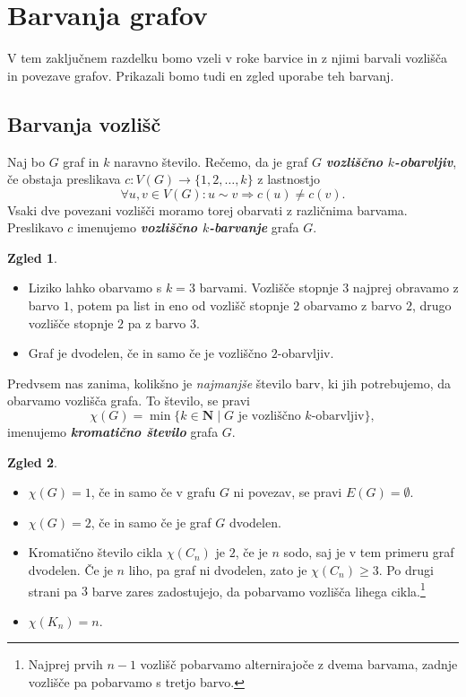 \documentclass[11pt]{book}
\def\NN{\mathbf{N}}
\def\definicija{\color{rdeca}\bf\em}
\theoremstyle{definition}
\theoremstyle{zgled}
\newtheorem*{zgled}{Zgled}
\theoremstyle{odprtproblem}
\theoremstyle{domacanaloga}
\theoremstyle{izrek}
\begin{document}
\section{Barvanja grafov}

V tem zaključnem razdelku bomo vzeli v roke barvice in z njimi barvali vozlišča in povezave grafov. Prikazali bomo tudi en zgled uporabe teh barvanj.

\subsection{Barvanja vozlišč}

Naj bo $G$ graf in $k$ naravno število. Rečemo, da je graf $G$ {\definicija vozliščno $k$-obarvljiv}, če obstaja preslikava $c \colon V(G) \to \{ 1,2, \dots, k\}$ z lastnostjo
\[
    \forall u,v \in V(G) \colon u \sim v \Rightarrow c(u) \neq c(v).
\]
Vsaki dve povezani vozlišči moramo torej obarvati z različnima barvama. Preslikavo $c$ imenujemo {\definicija vozliščno $k$-barvanje} grafa $G$.

\begin{zgled} \leavevmode
\begin{itemize}
\item Liziko lahko obarvamo s $k = 3$ barvami. Vozlišče stopnje $3$ najprej obravamo z barvo $1$, potem pa list in eno od vozlišč stopnje $2$ obarvamo z barvo $2$, drugo vozlišče stopnje $2$ pa z barvo $3$. 
\item Graf je dvodelen, če in samo če je vozliščno $2$-obarvljiv.
\end{itemize}
\end{zgled}

Predvsem nas zanima, kolikšno je \emph{najmanjše} število barv, ki jih potrebujemo, da obarvamo vozlišča grafa. To število, se pravi
\[
\chi(G) = \min \{ k \in \NN \mid \text{$G$ je vozliščno $k$-obarvljiv} \},
\]
imenujemo {\definicija kromatično število} grafa $G$.

\begin{zgled} \leavevmode
\begin{itemize}
    \item $\chi(G) = 1$, če in samo če v grafu $G$ ni povezav, se pravi $E(G) = \emptyset$.
    \item $\chi(G) = 2$, če in samo če je graf $G$ dvodelen.
    \item Kromatično število cikla $\chi(C_n)$ je $2$, če je $n$ sodo, saj je v tem primeru graf dvodelen. Če je $n$ liho, pa graf ni dvodelen, zato je $\chi(C_n) \geq 3$. Po drugi strani pa $3$ barve zares zadostujejo, da pobarvamo vozlišča lihega cikla.\footnote{Najprej prvih $n-1$ vozlišč pobarvamo alternirajoče z dvema barvama, zadnje vozlišče pa pobarvamo s tretjo barvo.}
    \item $\chi(K_n) = n$.
\end{itemize}
\end{zgled}
\end{document}
